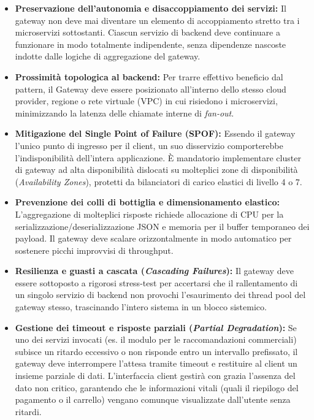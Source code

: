 \documentclass[11pt, a4paper]{article}
\begin{document}
\begin{itemize}[noitemsep]
    \item \textbf{Preservazione dell'autonomia e disaccoppiamento dei servizi:}
    Il gateway non deve mai diventare un elemento di accoppiamento stretto tra i microservizi sottostanti. Ciascun servizio di backend deve continuare a funzionare in modo totalmente indipendente, senza dipendenze nascoste indotte dalle logiche di aggregazione del gateway.

    \item \textbf{Prossimità topologica al backend:}
    Per trarre effettivo beneficio dal pattern, il Gateway deve essere posizionato all'interno dello stesso cloud provider, regione o rete virtuale (VPC) in cui risiedono i microservizi, minimizzando la latenza delle chiamate interne di \emph{fan-out}.

    \item \textbf{Mitigazione del Single Point of Failure (SPOF):}
    Essendo il gateway l'unico punto di ingresso per il client, un suo disservizio comporterebbe l'indisponibilità dell'intera applicazione. È mandatorio implementare cluster di gateway ad alta disponibilità dislocati su molteplici zone di disponibilità (\emph{Availability Zones}), protetti da bilanciatori di carico elastici di livello 4 o 7.

    \item \textbf{Prevenzione dei colli di bottiglia e dimensionamento elastico:}
    L'aggregazione di molteplici risposte richiede allocazione di CPU per la serializzazione/deserializzazione JSON e memoria per il buffer temporaneo dei payload. Il gateway deve scalare orizzontalmente in modo automatico per sostenere picchi improvvisi di throughput.

    \item \textbf{Resilienza e guasti a cascata (\emph{Cascading Failures}):}
    Il gateway deve essere sottoposto a rigorosi stress-test per accertarsi che il rallentamento di un singolo servizio di backend non provochi l'esaurimento dei thread pool del gateway stesso, trascinando l'intero sistema in un blocco sistemico.

    \item \textbf{Gestione dei timeout e risposte parziali (\emph{Partial Degradation}):}
    Se uno dei servizi invocati (es. il modulo per le raccomandazioni commerciali) subisce un ritardo eccessivo o non risponde entro un intervallo prefissato, il gateway deve interrompere l'attesa tramite timeout e restituire al client un insieme parziale di dati. L'interfaccia client gestirà con grazia l'assenza del dato non critico, garantendo che le informazioni vitali (quali il riepilogo del pagamento o il carrello) vengano comunque visualizzate dall'utente senza ritardi.
\end{itemize}
\end{document}
